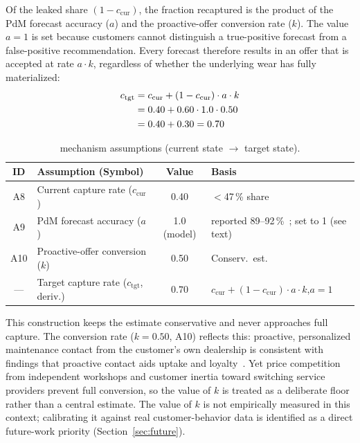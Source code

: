 \documentclass[conference,a4paper]{IEEEtran}
\newcommand{\cIst}{c_{\mathrm{cur}}}
\newcommand{\cSoll}{c_{\mathrm{tgt}}}
\begin{document}
Of the leaked share $(1-\cIst)$, the fraction recaptured is the product of the
PdM forecast accuracy ($a$) and the proactive-offer conversion rate ($k$). The value
$a{=}1$ is set because customers cannot distinguish a true-positive forecast
from a false-positive recommendation. Every forecast therefore results in an
offer that is accepted at rate $a \cdot k$, regardless of whether the underlying
wear has fully materialized:
\begin{align}
\cSoll &= \cIst + (1-\cIst)\cdot a \cdot k \notag \\
       &= 0.40 + 0.60 \cdot 1.0 \cdot 0.50 \notag \\
       &= 0.40 + 0.30 = 0.70
\end{align}
\vspace{-\intextsep}
\begin{table}[h!]
\caption{mechanism assumptions (current state $\rightarrow$ target state).}
\label{tab:mech}
\centering
\small
\begin{tabularx}{\columnwidth}{@{} c >{\raggedright\arraybackslash}X c >{\raggedright\arraybackslash}p{} @{}}
\toprule
\textbf{ID} & \textbf{Assumption (Symbol)} & \textbf{Value} & \textbf{Basis} \\
\midrule
A8  & Current capture rate ($\cIst$)       & 0.40            & ${<}$47\,\% share~\cite{dat2026report} \\
A9  & PdM forecast accuracy ($a$)          & 1.0 (model)     & reported 89--92\,\%~\cite{abougrad2026xai}; set to 1 (see text) \\
A10 & Proactive-offer conversion ($k$)     & 0.50            & Conserv.\ est.~\cite{challagalla_proactive_2009,gonzalez_service_2015} \\
--- & Target capture rate ($\cSoll$, deriv.)& $0.70$         & $\cIst+(1{-}\cIst)\cdot a\cdot k$,\;$a{=}1$ \\
\bottomrule
\end{tabularx}
\end{table}

This construction keeps the estimate conservative and never approaches full
capture. The conversion rate ($k = 0.50$, A10) reflects this: proactive,
personalized maintenance contact from the customer's own dealership is
consistent with findings that proactive contact aids uptake and
loyalty~\cite{challagalla_proactive_2009,gonzalez_service_2015}. Yet price
competition from independent workshops and customer inertia toward switching
service providers prevent full conversion, so the value of $k$ is treated as
a deliberate floor rather than a central estimate. The value of $k$ is not empirically
measured in this context; calibrating it against real customer-behavior data
is identified as a direct future-work priority (Section~\ref{sec:future}).
\end{document}
